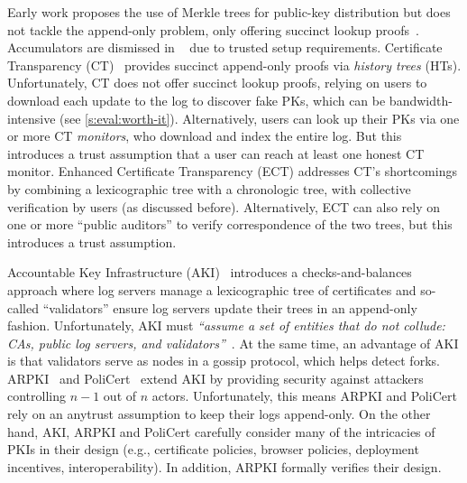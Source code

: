 Early work proposes the use of Merkle trees for public-key distribution but does not tackle the append-only problem, only offering succinct lookup proofs~\cite{crt,certificate-rev-upd,BuldasLaudLipmaa2000}.
Accumulators are dismissed in ~\cite{BuldasLaudLipmaa2000} due to trusted setup requirements.
Certificate Transparency (CT)~\cite{ct} provides succinct append-only proofs via \textit{history trees} (HTs).
Unfortunately, CT does not offer succinct lookup proofs, relying on users to download each update to the log to discover fake PKs, which can be bandwidth-intensive (see \cref{s:eval:worth-it}).
Alternatively, users can look up their PKs via one or more CT \textit{monitors}, who download and index the entire log.
But this introduces a trust assumption that a user can reach at least one honest CT monitor.
Enhanced Certificate Transparency (ECT) addresses CT's shortcomings by combining a lexicographic tree with a chronologic tree, with collective verification by users (as discussed before).
Alternatively, ECT can also rely on one or more ``public auditors'' to verify correspondence of the two trees, but this introduces a trust assumption.

Accountable Key Infrastructure (AKI)~\cite{aki} introduces a checks-and-balances approach where log servers manage a lexicographic tree of certificates and so-called ``validators'' ensure log servers update their trees in an append-only fashion.
Unfortunately, AKI must \textit{``assume a set of entities that do not collude: CAs, public log servers, and validators''}~\cite{aki}. 
At the same time, an advantage of AKI is that validators serve as nodes in a gossip protocol, which helps detect forks.
ARPKI~\cite{arpki} and PoliCert~\cite{policert} extend AKI by providing security against attackers controlling $n-1$ out of $n$ actors.
Unfortunately, this means ARPKI and PoliCert rely on an anytrust assumption to keep their logs append-only.
On the other hand, AKI, ARPKI and PoliCert carefully consider many of the intricacies of PKIs in their design (e.g., certificate policies, browser policies, deployment incentives, interoperability).
In addition, ARPKI formally verifies their design.

